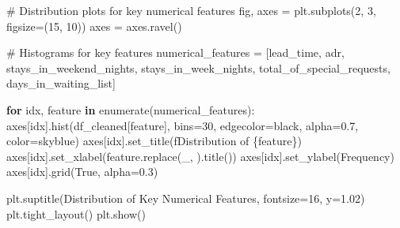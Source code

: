 \documentclass[
  letterpaper,
  DIV=11,
  numbers=noendperiod]{scrartcl}
\newenvironment{Shaded}{\begin{snugshade}}{\end{snugshade}}
\newcommand{\BuiltInTok}[1]{\textcolor[rgb]{0.00,0.23,0.31}{#1}}
\newcommand{\CommentTok}[1]{\textcolor[rgb]{0.37,0.37,0.37}{#1}}
\newcommand{\ControlFlowTok}[1]{\textcolor[rgb]{0.00,0.23,0.31}{\textbf{#1}}}
\newcommand{\DecValTok}[1]{\textcolor[rgb]{0.68,0.00,0.00}{#1}}
\newcommand{\FloatTok}[1]{\textcolor[rgb]{0.68,0.00,0.00}{#1}}
\newcommand{\KeywordTok}[1]{\textcolor[rgb]{0.00,0.23,0.31}{\textbf{#1}}}
\newcommand{\NormalTok}[1]{\textcolor[rgb]{0.00,0.23,0.31}{#1}}
\newcommand{\OperatorTok}[1]{\textcolor[rgb]{0.37,0.37,0.37}{#1}}
\newcommand{\SpecialCharTok}[1]{\textcolor[rgb]{0.37,0.37,0.37}{#1}}
\newcommand{\SpecialStringTok}[1]{\textcolor[rgb]{0.13,0.47,0.30}{#1}}
\newcommand{\StringTok}[1]{\textcolor[rgb]{0.13,0.47,0.30}{#1}}
\newcommand{\VariableTok}[1]{\textcolor[rgb]{0.07,0.07,0.07}{#1}}
\renewenvironment{Shaded}{%
  \begin{tcolorbox}[%
    enhanced,%
    colback=codebg,%
    colframe=codebg,%
    borderline west={3pt}{0pt}{sectionblue},%
    fontupper=\small\ttfamily,%
    boxrule=0pt,%
    arc=0pt,%
    boxsep=5pt,%
    left=2mm,%
    right=2mm,%
    top=2mm,%
    bottom=2mm%
  ]%
}{%
  \end{tcolorbox}%
}
\begin{document}
\begin{Shaded}
\begin{Highlighting}[]
\CommentTok{\# Distribution plots for key numerical features}
\NormalTok{fig, axes }\OperatorTok{=}\NormalTok{ plt.subplots(}\DecValTok{2}\NormalTok{, }\DecValTok{3}\NormalTok{, figsize}\OperatorTok{=}\NormalTok{(}\DecValTok{15}\NormalTok{, }\DecValTok{10}\NormalTok{))}
\NormalTok{axes }\OperatorTok{=}\NormalTok{ axes.ravel()}

\CommentTok{\# Histograms for key features}
\NormalTok{numerical\_features }\OperatorTok{=}\NormalTok{ [}\StringTok{\textquotesingle{}lead\_time\textquotesingle{}}\NormalTok{, }\StringTok{\textquotesingle{}adr\textquotesingle{}}\NormalTok{, }\StringTok{\textquotesingle{}stays\_in\_weekend\_nights\textquotesingle{}}\NormalTok{, }
                     \StringTok{\textquotesingle{}stays\_in\_week\_nights\textquotesingle{}}\NormalTok{, }\StringTok{\textquotesingle{}total\_of\_special\_requests\textquotesingle{}}\NormalTok{, }
                     \StringTok{\textquotesingle{}days\_in\_waiting\_list\textquotesingle{}}\NormalTok{]}

\ControlFlowTok{for}\NormalTok{ idx, feature }\KeywordTok{in} \BuiltInTok{enumerate}\NormalTok{(numerical\_features):}
\NormalTok{    axes[idx].hist(df\_cleaned[feature], }
\NormalTok{                   bins}\OperatorTok{=}\DecValTok{30}\NormalTok{, }
\NormalTok{                   edgecolor}\OperatorTok{=}\StringTok{\textquotesingle{}black\textquotesingle{}}\NormalTok{, }
\NormalTok{                   alpha}\OperatorTok{=}\FloatTok{0.7}\NormalTok{, }
\NormalTok{                   color}\OperatorTok{=}\StringTok{\textquotesingle{}skyblue\textquotesingle{}}\NormalTok{)}
\NormalTok{    axes[idx].set\_title(}\SpecialStringTok{f\textquotesingle{}Distribution of }\SpecialCharTok{\{}\NormalTok{feature}\SpecialCharTok{\}}\SpecialStringTok{\textquotesingle{}}\NormalTok{)}
\NormalTok{    axes[idx].set\_xlabel(feature.replace(}\StringTok{\textquotesingle{}\_\textquotesingle{}}\NormalTok{, }\StringTok{\textquotesingle{} \textquotesingle{}}\NormalTok{).title())}
\NormalTok{    axes[idx].set\_ylabel(}\StringTok{\textquotesingle{}Frequency\textquotesingle{}}\NormalTok{)}
\NormalTok{    axes[idx].grid(}\VariableTok{True}\NormalTok{, alpha}\OperatorTok{=}\FloatTok{0.3}\NormalTok{)}

\NormalTok{plt.suptitle(}\StringTok{\textquotesingle{}Distribution of Key Numerical Features\textquotesingle{}}\NormalTok{, fontsize}\OperatorTok{=}\DecValTok{16}\NormalTok{, y}\OperatorTok{=}\FloatTok{1.02}\NormalTok{)}
\NormalTok{plt.tight\_layout()}
\NormalTok{plt.show()}


\end{Highlighting}
\end{Shaded}
\end{document}
